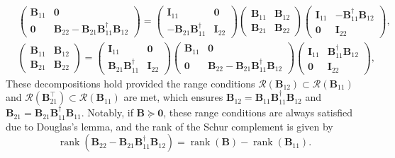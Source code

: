 \documentclass[noinfoline]{imsart}\setcounter{tocdepth}{2}
\newcommand{\m}[1]{\mathbf{#1}} %
\renewcommand{\c}[1]{\mathcal{#1}} %
\DeclareMathOperator*{\rk}{rank}
\theoremstyle{plain}
\begin{document}
\begin{align}
    &\begin{pmatrix}
        \m{B}_{11} & \m{0} \\
        \m{0} & \m{B}_{22} - \m{B}_{21} \m{B}_{11}^{\dagger} \m{B}_{12}
    \end{pmatrix} = \begin{pmatrix}
        \m{I}_{11} & \m{0} \\
        - \m{B}_{21} \m{B}_{11}^{\dagger} & \m{I}_{22}
    \end{pmatrix}
    \begin{pmatrix}
        \m{B}_{11} & \m{B}_{12} \\
        \m{B}_{21} & \m{B}_{22}
    \end{pmatrix} \begin{pmatrix}
        \m{I}_{11} & - \m{B}_{11}^{\dagger} \m{B}_{12}  \\
        \m{0} & \m{I}_{22}
    \end{pmatrix}, \label{eq:LDU1} \\
    &\begin{pmatrix}
        \m{B}_{11} & \m{B}_{12} \\
        \m{B}_{21} & \m{B}_{22}
    \end{pmatrix} = \begin{pmatrix}
        \m{I}_{11} & \m{0} \\
        \m{B}_{21} \m{B}_{11}^{\dagger} & \m{I}_{22}
    \end{pmatrix}
    \begin{pmatrix}
        \m{B}_{11} & \m{0} \\
        \m{0} & \m{B}_{22} - \m{B}_{21} \m{B}_{11}^{\dagger} \m{B}_{12}
    \end{pmatrix} \begin{pmatrix}
        \m{I}_{11} & \m{B}_{11}^{\dagger} \m{B}_{12}  \\
        \m{0} & \m{I}_{22}
    \end{pmatrix}, \label{eq:LDU2}
\end{align}
These decompositions hold provided the range conditions $\c{R}(\m{B}_{12}) \subset \c{R}(\m{B}_{11})$ and $\c{R}(\m{B}_{21}^{\top}) \subset \c{R}(\m{B}_{11})$ are met, which ensures $\m{B}_{12} = \m{B}_{11} \m{B}_{11}^{\dagger} \m{B}_{12}$ and $\m{B}_{21} = \m{B}_{21} \m{B}_{11}^{\dagger} \m{B}_{11}$. Notably, if $\m{B} \succeq \m{0}$, these range conditions are always satisfied due to Douglas's lemma, and the rank of the Schur complement is given by
\begin{equation*}
    \rk (\m{B}_{22} - \m{B}_{21} \m{B}_{11}^{\dagger} \m{B}_{12}) = \rk (\m{B}) - \rk (\m{B}_{11}).
\end{equation*}
\end{document}
